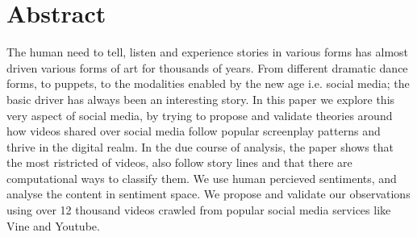 \section{Abstract}
\begin{comment}
The Art of story telling could be attributed to be one of the most ancient arts. One might give a considerable chunk of credit for the possibility of humans to trace their footsteps across history, to this very art. This paper tries to explore the art of story telling in the realm of Online Social Networks (OSNs) and online social media. Our work hypotheses that the presence of the well known screen play graph, which directs the over all sentiment of a movie or a drama through time, is very well present in the micro videos posted on the newly available mediums of Vine, Instragram and twitter. The In the due course of the work done for the paper, we crawled a popular social media network called Vine for almost 2 months and collected over 12000 unique vine videos and their meta data. We try to take an approach based on perceptual sentiment in social media and hypothesize existence of story lines in perceptual sentiments. We use deep learning tools to detect sentiment values of videos frames and eventually show to a reasonable extent, that perceptual sentiments do follow popular screen-writing theories. The sentiment transitions across these short but high impact videos, do follow certain trends which could be explained from popular screenplay writing theories. The paper also evaluates correlations of individual perceptual sentiments of videos with popularity metrics of the videos. The paper validates presence of genres based on perceptual sentiments of videos and tries to explain them using some popular screenplay techniques.
\end{comment}
The human need to tell, listen and experience stories in various forms has almost driven various forms of art for thousands of years. From different dramatic dance forms, to puppets, to the modalities enabled by the new age i.e. social media; the basic driver has always been an interesting story. In this paper we explore this very aspect of social media, by trying to propose and validate theories around how videos shared over social media follow popular screenplay patterns and thrive in the digital realm. In the due course of analysis, the paper shows that the most ristricted of videos, also follow story lines and that there are computational ways to classify them. We use human percieved sentiments, and analyse the content in sentiment space. We propose and validate our observations using over 12 thousand videos crawled from popular social media services like Vine and Youtube.
 